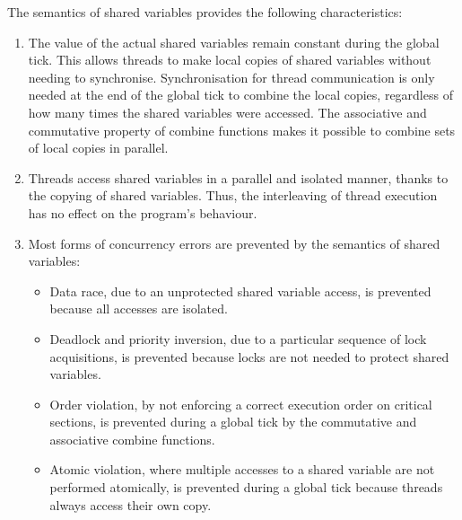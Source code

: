 The semantics of shared variables provides the following characteristics:
\begin{enumerate}
	\item The value of the actual shared variables remain constant during the
		  global tick. This allows threads to make local copies of shared 
		  variables without needing to synchronise. Synchronisation for 
		  thread communication is only needed at the end of the global tick to 
		  combine the local copies, regardless of how many times the shared 
		  variables were accessed. 
		  The associative and commutative property of combine functions 
		  makes it possible to combine sets of local copies in parallel.
	\item Threads access shared variables in a parallel and isolated 
		  manner, thanks to the copying of shared variables. 
		  Thus, the interleaving of thread execution has no effect on the 
		  program's behaviour.
	\item Most forms of concurrency errors are prevented by the semantics 
		  of shared variables:
		  \begin{itemize}
		  	\item Data race, due to an unprotected shared variable access, is 
				  prevented because all accesses are isolated.
			\item Deadlock and priority inversion, due to a particular sequence
				  of lock acquisitions, is prevented because locks are not needed 
				  to protect shared variables. 
			\item Order violation, by not enforcing a correct execution order on 
				  critical sections, is prevented during a global tick 
				  by the commutative and associative combine functions.
			\item Atomic violation, where multiple accesses to a shared variable
				  are not performed atomically, is prevented during a global 
				  tick because threads always access their own copy.
		  \end{itemize}
\end{enumerate}

